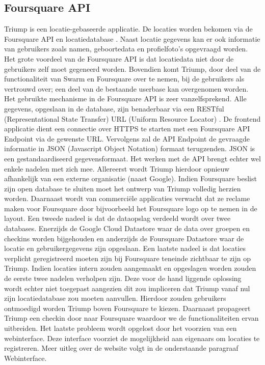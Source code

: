 \subsection{Foursquare API}
\label{Foursquare API}
Triump is een locatie-gebaseerde applicatie. De locaties worden bekomen via de Foursquare API en locatiedatabase \cite{FS_API_website}. Naast locatie gegevens kan er ook informatie van gebruikers zoals namen, geboortedata en profielfoto's opgevraagd worden.
Het grote voordeel van de Foursquare API is dat locatiedata niet door de gebruikers zelf moet gegeneerd worden. Bovendien komt Triump, door deel van de functionaliteit van Swarm en Foursquare over te nemen, bij de gebruikers als vertrouwd over; een deel van de bestaande userbase kan overgenomen worden. 
Het gebruikte mechanisme in de Foursquare API is zeer vanzelfsprekend. Alle gegevens, opgeslaan in de database, zijn benaderbaar via een RESTful (Representational State Transfer) URL (Uniform Resource Locator) . De frontend applicatie dient een connectie over HTTPS te starten met een Foursquare API Endpoint via de gewenste URL. Vervolgens zal de API Endpoint de gevraagde informatie in JSON (Javascript Object Notation) formaat terugzenden. JSON is een gestandaardiseerd gegevensformaat.
Het werken met de API brengt echter wel enkele nadelen met zich mee.
Allereerst wordt Triump hierdoor opnieuw afhankelijk van een externe organisatie (naast Google). Indien Foursquare beslist zijn open database te sluiten moet het ontwerp van Triump volledig herzien worden. Daarnaast wordt van commerciële applicaties verwacht dat ze reclame maken voor Foursquare door bijvoorbeeld het Foursquare logo op te nemen in de layout.  Een tweede nadeel is dat de dataopslag verdeeld wordt over twee databases. Enerzijds de Google Cloud Datastore waar de data over groepen en checkins worden bijgehouden en anderzijds de Foursquare Datastore waar de locatie en gebruikergegevens zijn opgeslaan. Een laatste nadeel is dat locaties verplicht geregistreerd moeten zijn bij Foursquare teneinde zichtbaar te zijn op Triump. 
Indien locaties intern zouden aangemaakt en opgeslagen worden zouden de eerste twee nadelen verholpen zijn. Deze voor de hand liggende oplossing wordt echter niet toegepast aangezien dit zou impliceren dat Triump vanaf nul zijn locatiedatabase zou moeten aanvullen. Hierdoor zouden gebruikers ontmoedigd worden Triump boven Foursquare te kiezen. Daarnaast propageert Triump een checkin door naar Foursquare waardoor we de functionaliteiten ervan uitbreiden. 
Het laatste probleem wordt opgelost door het voorzien van een webinterface. Deze interface voorziet de mogelijkheid aan eigenaars om locaties te registreren. Meer uitleg over de website volgt in de onderstaande paragraaf Webinterface.
